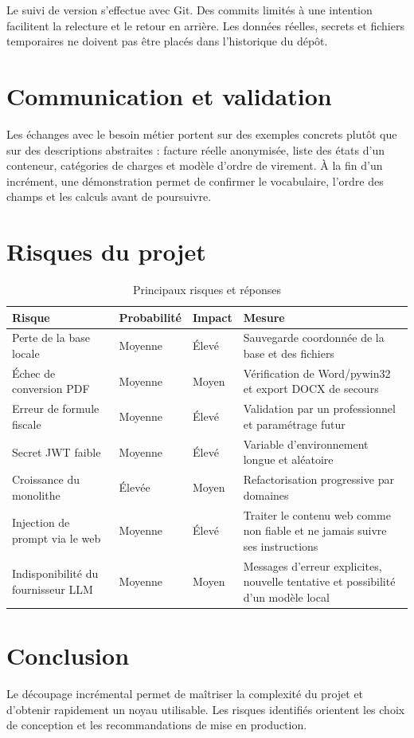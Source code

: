 \documentclass[12pt,a4paper,oneside]{report}
\begin{document}
Le suivi de version s'effectue avec Git. Des commits limités à une intention facilitent la relecture et le retour en arrière. Les données réelles, secrets et fichiers temporaires ne doivent pas être placés dans l'historique du dépôt.

\section{Communication et validation}
Les échanges avec le besoin métier portent sur des exemples concrets plutôt que sur des descriptions abstraites : facture réelle anonymisée, liste des états d'un conteneur, catégories de charges et modèle d'ordre de virement. À la fin d'un incrément, une démonstration permet de confirmer le vocabulaire, l'ordre des champs et les calculs avant de poursuivre.

\section{Risques du projet}
\begin{table}[H]\centering
\caption{Principaux risques et réponses}
\begin{tabularx}{\textwidth}{Y p{2.2cm}p{2.2cm}Y}
\toprule \textbf{Risque} & \textbf{Probabilité} & \textbf{Impact} & \textbf{Mesure}\\ \midrule
Perte de la base locale & Moyenne & Élevé & Sauvegarde coordonnée de la base et des fichiers\\
Échec de conversion PDF & Moyenne & Moyen & Vérification de Word/pywin32 et export DOCX de secours\\
Erreur de formule fiscale & Moyenne & Élevé & Validation par un professionnel et paramétrage futur\\
Secret JWT faible & Moyenne & Élevé & Variable d'environnement longue et aléatoire\\
Croissance du monolithe & Élevée & Moyen & Refactorisation progressive par domaines\\
Injection de prompt via le web & Moyenne & Élevé & Traiter le contenu web comme non fiable et ne jamais suivre ses instructions\\
Indisponibilité du fournisseur LLM & Moyenne & Moyen & Messages d'erreur explicites, nouvelle tentative et possibilité d'un modèle local\\
\bottomrule
\end{tabularx}
\end{table}

\section*{Conclusion}
Le découpage incrémental permet de maîtriser la complexité du projet et d'obtenir rapidement un noyau utilisable. Les risques identifiés orientent les choix de conception et les recommandations de mise en production.
\end{document}
